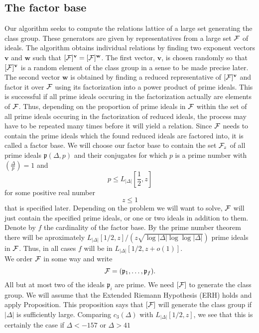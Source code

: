\documentclass[12pt, letterpaper]{report}
\begin{document}
\subsection{The factor base}
Our algorithm seeks to compute the relations lattice of a large set generating
the class group. These generators are given by representatives from a large
set ${\cal F}$ of ideals. The algorithm obtains individual relations by finding two
exponent vectors ${\mathbf v}$ and ${\mathbf w}$ such that $[{\cal F}]^{\mathbf v} = [{\cal F}]^{\mathbf w}$. The first vector, ${\mathbf v}$, is
chosen randomly so that $[{\cal F}]^{\mathbf v}$ is a random element of the class group in a sense to be made precise later. 
The second vector ${\mathbf w}$ is obtained by finding a reduced representative of $[{\cal F}]^{\mathbf v}$ and factor it over ${\cal F}$ using its 
factorization into a power product of prime ideals. This is successful if all prime ideals occuring in the factorization actually are elements of 
${\cal F}$. Thus, depending on the proportion of prime ideals in ${\cal F}$ within the set of all prime ideals occuring in the factorization of reduced ideals, 
the process may have to be repeated many times before it will yield a relation.
Since ${\cal F}$ needs to contain the prime ideals which the found reduced ideals are factored into, it is called a factor base. We will choose our factor base to
contain the set ${\cal F}_z$ of all prime ideals $\mathfrak{p}(\Delta, p)$ and their conjugates for which $p$
is a prime number with $\left(\frac{\Delta}{p}\right) = 1$ and
$$
p \le L_{|\Delta|}\left[\frac 12, z\right]
$$
for some positive real number
$$
z \le 1
$$
that is specified later. Depending on the problem we will want to solve, ${\cal F}$
will just contain the specified prime ideals, or one or two ideals in addition to
them. Denote by $f$ the cardinality of the factor base. By the prime number
theorem there will be aproximately $L_{|\Delta|}[1/2, z]/(z\sqrt{\log{|\Delta|} \log{\log|\Delta|}})$ prime
ideals in ${\cal F}$. Thus, in all cases $f$ will be in $L_{|\Delta|}[1/2, z + o(1)]$.\\
We order ${\cal F}$ in some way and write
$$
{\cal F} = (\mathfrak{p}_1 ,\dots, \mathfrak{p}_f ).
$$
All but at most two of the ideals $\mathfrak{p}_i$ are prime.
We need $[{\cal F}]$ to generate the class group. We will assume that the Extended Riemann Hypothesis (ERH)
holds and apply Proposition. This proposition says that $[{\cal F}]$ will generate
the class group if $|\Delta|$ is sufficiently large. Comparing $c_{3}(\Delta)$ with
$L_{|\Delta|}[1/2, z]$, we see that this is certainly the case if $\Delta < −157$ or $\Delta > 41$
\end{document}
